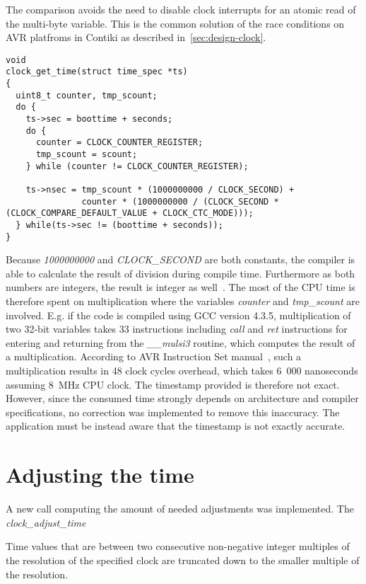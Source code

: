 The comparison avoids the need to disable clock interrupts for an atomic
read of the multi-byte variable.
This is the common solution of the race conditions
on AVR platfroms in Contiki as described in~\ref{sec:design-clock}.
\begin{lstlisting}
void
clock_get_time(struct time_spec *ts)
{
  uint8_t counter, tmp_scount;
  do {
    ts->sec = boottime + seconds;
    do {
      counter = CLOCK_COUNTER_REGISTER;
      tmp_scount = scount;
    } while (counter != CLOCK_COUNTER_REGISTER);

    ts->nsec = tmp_scount * (1000000000 / CLOCK_SECOND) +
               counter * (1000000000 / (CLOCK_SECOND * (CLOCK_COMPARE_DEFAULT_VALUE + CLOCK_CTC_MODE)));
  } while(ts->sec != (boottime + seconds));
}
\end{lstlisting}
Because {\it{1000000000}} and {\it{CLOCK\_SECOND}} are both constants, the compiler is able to
calculate the result of division during compile time.
Furthermore as both numbers are integers, the result is integer as well~\cite{c99}.
The most of the CPU time is therefore spent on multiplication where the variables
{\it{counter}} and {\it{tmp\_scount}} are involved.
E.g. if the code is compiled using GCC version 4.3.5,
multiplication of two 32-bit variables takes 33 instructions including {\it{call}} and {\it{ret}}
instructions for entering and returning from the {\it{\_\_mulsi3}} routine, which computes
the result of a multiplication.
According to AVR Instruction Set manual~\cite{avr-instruction-set},
such a multiplication results in 48 clock cycles overhead,
which takes 6~000 nanoseconds assuming 8~MHz CPU clock.
The timestamp provided is therefore not exact.
However, since the consumed time strongly depends on architecture and compiler specifications,
no correction was implemented to remove this inaccuracy.
The application must be instead aware that the timestamp is not exactly accurate.

\section{Adjusting the time}
A new call computing the amount of needed adjustments was implemented.
The {\it{clock\_adjust\_time}}

Time values that are between two consecutive non-negative integer multiples
of the resolution of the specified clock are truncated down to the smaller multiple of the resolution.






